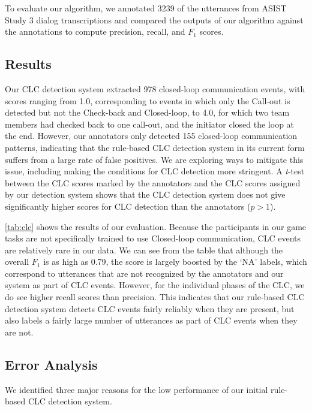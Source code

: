 To evaluate our algorithm, we annotated 3239 of the utterances from ASIST Study
3 dialog transcriptions and compared the outputs of our algorithm against the
annotations to compute precision, recall, and $F_1$ scores.


\subsection{Results}

Our CLC detection system extracted 978 closed-loop communication events,
with scores ranging from 1.0, corresponding to events in which only the
Call-out is detected but not the Check-back
and Closed-loop, to 4.0, for which two team members had checked back to one
call-out, and the initiator closed the loop at the end. However, our annotators
only detected 155 closed-loop communication patterns, indicating that the
rule-based CLC detection system in its current form suffers from a large rate
of false positives. We are exploring ways to mitigate this issue, including
making the conditions for CLC detection more stringent.
A \emph{t}-test between the CLC scores marked by the annotators and the
CLC scores assigned by our detection system shows that the CLC detection system
does not give significantly higher scores for CLC detection than the annotators
($p > 1$). 

\autoref{tab:clc} shows the results of our evaluation. Because the participants
in our game tasks are not specifically trained to use Closed-loop
communication, CLC events are relatively rare in our data. We can
see from the table that although the overall $F_1$ is as high as 0.79, the score
is largely boosted by the `NA' labels, which correspond to utterances that are
not recognized by the annotators and our system as part of CLC events.
However, for the individual phases of the CLC, we do see higher
recall scores than precision. This indicates that our rule-based CLC detection
system detects CLC events fairly reliably when they are present, but also
labels a fairly large number of utterances as part of CLC events when they are
not.

\subsection{Error Analysis}

We identified three major reasons for the low performance of our initial
rule-based CLC detection system.

